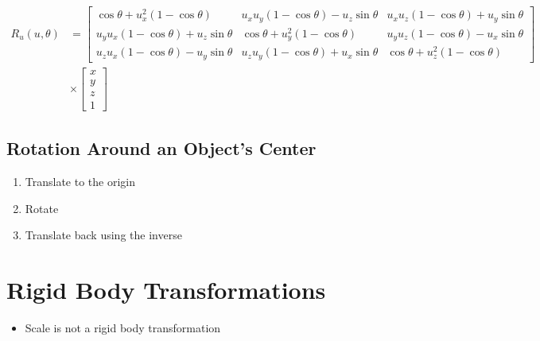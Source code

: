   \begin{align*}
    R_{u}\left( u, \theta \right) &=
    \begin{bmatrix}
      \cos\theta + u_{x}^{2}\left( 1 - \cos\theta \right)
      & u_{x} u_{y} \left( 1 - \cos\theta \right) - u_{z} \sin\theta
      & u_{x} u_{z} \left( 1 - \cos\theta \right) + u_{y} \sin\theta \\
      u_{y} u_{x} \left( 1 - \cos\theta \right) + u_{z} \sin\theta
      & \cos\theta + u_{y}^{2}\left( 1 - \cos\theta \right)
      & u_{y} u_{z} \left( 1 - \cos\theta \right) - u_{x} \sin\theta \\
      u_{z} u_{x} \left( 1 - \cos\theta \right) - u_{y} \sin\theta
      & u_{z} u_{y} \left( 1 - \cos\theta \right) + u_{x} \sin\theta
      & \cos\theta + u_{z}^{2}\left( 1 - \cos\theta \right)
    \end{bmatrix} \\
    &\times
    \begin{bmatrix}
      x \\
      y \\
      z \\
      1
    \end{bmatrix}
  \end{align*}

  \subsection{Rotation Around an Object's Center}

    \begin{enumerate}
      \item Translate to the origin
      \item Rotate
      \item Translate back using the inverse
    \end{enumerate}

\section{Rigid Body Transformations}

  \begin{itemize}
    \item Scale is not a rigid body transformation
  \end{itemize}
